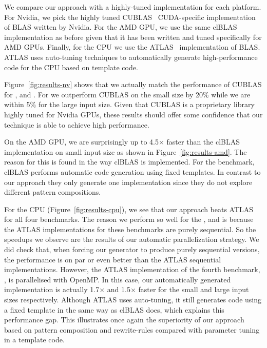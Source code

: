 We compare our approach with a highly-tuned implementation for each platform.
For Nvidia, we pick the highly tuned CUBLAS~\cite{cuBLAS} CUDA-specific implementation of BLAS written by Nvidia.
For the AMD GPU, we use the same clBLAS~\cite{clBlas} implementation as before given that it has been written and tuned specifically for AMD GPUs.
Finally, for the CPU we use the ATLAS~\cite{whaley98atlas} implementation of BLAS.
ATLAS uses auto-tuning techniques to automatically generate high-performance code for the CPU based on template code.

Figure~\ref{fig:results-nv} shows that we actually match the performance of CUBLAS for ,  and .
For  we outperform CUBLAS on the small size by 20\% while we are within 5\% for the large input size.
Given that CUBLAS is a proprietary library highly tuned for Nvidia GPUs, these results should offer some confidence that our technique is able to achieve high performance.

On the AMD GPU, we are surprisingly up to 4.5$\times$ faster than the clBLAS implementation on  small input size as shown in Figure~\ref{fig:results-amd}.
The reason for this is found in the way clBLAS is implemented.
For the  benchmark, clBLAS performs automatic code generation using fixed templates.
In contrast to our approach they only generate one implementation since they do not explore different pattern compositions.

For the CPU (Figure~\ref{fig:results-cpu}), we see that our approach beats ATLAS for all four benchmarks.
The reason we perform so well for the ,  and  is because the ATLAS implementations for these benchmarks are purely sequential.
So the speedups we observe are the results of our automatic parallelization strategy.
We did check that, when forcing our generator to produce purely sequential versions, the performance is on par or even better than the ATLAS sequential implementations.
However, the ATLAS implementation of the fourth benchmark, , is parallelised with OpenMP.
In this case, our automatically generated implementation is actually 1.7$\times$ and 1.5$\times$ faster for the small and large input sizes respectively.
Although ATLAS uses auto-tuning, it still generates code using a fixed template in the same way as clBLAS does, which explains this performance gap.
This illustrates once again the superiority of our approach based on pattern composition and rewrite-rules compared with parameter tuning in a template code.

